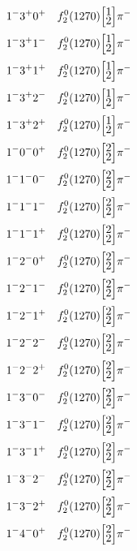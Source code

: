 \documentclass[10pt,a4paper]{article}
\def\dst{\displaystyle}
\def\vsp{\hbox{\vrule height12.5pt depth3.5pt width0pt}}
\def\ells#1#2{\Big[\hskip-5pt\vsp\begin{array}{c}\dst#1\\[-4pt]\dst#2\end{array}\vsp\hskip-5pt\Big]}
\begin{document}
\begin{align*} 
 \begin{aligned}
1^{-}3^{+}0^{+}\quad & f_2^0(1270)\ells{1}{2}\pi^-\\
1^{-}3^{+}1^{-}\quad & f_2^0(1270)\ells{1}{2}\pi^-\\
1^{-}3^{+}1^{+}\quad & f_2^0(1270)\ells{1}{2}\pi^-\\
1^{-}3^{+}2^{-}\quad & f_2^0(1270)\ells{1}{2}\pi^-\\
1^{-}3^{+}2^{+}\quad & f_2^0(1270)\ells{1}{2}\pi^-\\
1^{-}0^{-}0^{+}\quad & f_2^0(1270)\ells{2}{2}\pi^-\\
1^{-}1^{-}0^{-}\quad & f_2^0(1270)\ells{2}{2}\pi^-\\
1^{-}1^{-}1^{-}\quad & f_2^0(1270)\ells{2}{2}\pi^-\\
1^{-}1^{-}1^{+}\quad & f_2^0(1270)\ells{2}{2}\pi^-\\
1^{-}2^{-}0^{+}\quad & f_2^0(1270)\ells{2}{2}\pi^-\\
1^{-}2^{-}1^{-}\quad & f_2^0(1270)\ells{2}{2}\pi^-\\
1^{-}2^{-}1^{+}\quad & f_2^0(1270)\ells{2}{2}\pi^-\\
1^{-}2^{-}2^{-}\quad & f_2^0(1270)\ells{2}{2}\pi^-\\
1^{-}2^{-}2^{+}\quad & f_2^0(1270)\ells{2}{2}\pi^-\\
1^{-}3^{-}0^{-}\quad & f_2^0(1270)\ells{2}{2}\pi^-\\
1^{-}3^{-}1^{-}\quad & f_2^0(1270)\ells{2}{2}\pi^-\\
1^{-}3^{-}1^{+}\quad & f_2^0(1270)\ells{2}{2}\pi^-\\
1^{-}3^{-}2^{-}\quad & f_2^0(1270)\ells{2}{2}\pi^-\\
1^{-}3^{-}2^{+}\quad & f_2^0(1270)\ells{2}{2}\pi^-\\
1^{-}4^{-}0^{+}\quad & f_2^0(1270)\ells{2}{2}\pi^-\\
\end{aligned} 
 \end{align*}\pagebreak
\end{document}
